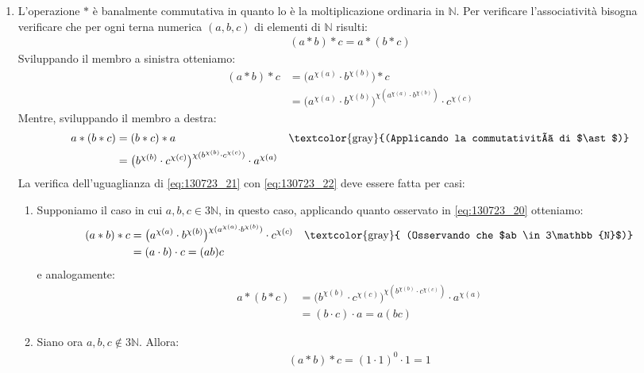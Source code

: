 \begin{enumerate}[label=(\textit{\roman*})]
	\item L'operazione $\ast$ è banalmente commutativa in quanto lo è la moltiplicazione ordinaria in $\mathbb{N}$. Per verificare l'associatività bisogna verificare che per ogni terna numerica $(a,b,c)$ di elementi di $\mathbb{N}$ risulti:
	\begin{align*}
		(a \ast b) \ast c = a \ast (b \ast c)
	\end{align*}
	Sviluppando il membro a sinistra otteniamo:
	\begin{align}
		(a \ast b) \ast c &= \bigl(a^{\chi(a)} \cdot b^{\chi(b)} \bigr) \ast c \nonumber \\
		&= \bigl( a^{\chi(a)} \cdot b^{\chi(b)}\bigr)^{\chi(a^{\chi(a)} \cdot b^{\chi(b)})} \cdot c^{\chi(c)} \label{eq:130723_21}
	\end{align}
	Mentre, sviluppando il membro a destra:
	\begin{align}
		a \ast (b \ast c) &= (b \ast c) \ast a & \text{\textcolor{gray}{(Applicando la commutatività di $\ast$)}} \nonumber \\
		&= \bigl(b^{\chi(b)}\cdot c^{\chi(c)}\bigr)^{\chi(b^{\chi(b)} \cdot c^{\chi(c)})} \cdot a^{\chi(a)} \label{eq:130723_22}
	\end{align}
	La verifica dell'uguaglianza di \ref{eq:130723_21} con \ref{eq:130723_22} deve essere fatta per casi:
	\begin{enumerate}
		\item Supponiamo il caso in cui $a,b,c \in 3\mathbb{N}$, in questo caso, applicando quanto osservato in \ref{eq:130723_20} otteniamo:
		\begin{align*}
			(a \ast b) \ast c &= \bigl( a^{\chi(a)} \cdot b^{\chi(b)}\bigr)^{\chi(a^{\chi(a)} \cdot b^{\chi(b)})} \cdot c^{\chi(c)} & \text{\textcolor{gray}{
					(Osservando che $ab \in 3\mathbb{N}$)}}\\
			&= (a\cdot b) \cdot c = (ab)c 
		\end{align*}
		e analogamente:
		\begin{align*}
			a \ast (b \ast c) &= \bigl(b^{\chi(b)}\cdot c^{\chi(c)}\bigr)^{\chi(b^{\chi(b)} \cdot c^{\chi(c)})} \cdot a^{\chi(a)} \\
			&= (b \cdot c) \cdot a = a(bc)
		\end{align*}
		\item Siano ora $a,b,c \notin 3\mathbb{N}$. Allora:
		\begin{align*}
			(a \ast b) \ast c = (1 \cdot 1)^{0} \cdot 1 = 1 \\

\end{align*}
\end{enumerate}
\end{enumerate}
